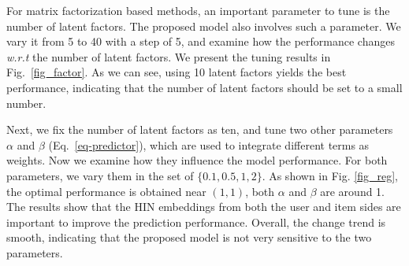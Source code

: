 For matrix factorization based methods, an important parameter to tune is the number of latent factors. The proposed model also involves such a parameter.
We vary it from 5 to 40 with a step of 5, and examine how the performance changes \emph{w.r.t} the number of latent factors.
We present the tuning results in Fig.~\ref{fig_factor}. As we can see, using 10 latent factors yields the best performance, indicating that
the number of latent factors should be set to a small number.

Next, we fix the number of latent factors as ten, and tune two other parameters $\alpha$ and $\beta$ (Eq.~\ref{eq-predictor}), which are used to integrate different terms as weights.
Now we examine how they influence the model performance. For both parameters, we vary them in the set of $\{0.1, 0.5, 1, 2\}$.
 As shown in Fig. \ref{fig_reg}, the optimal performance is obtained near $(1,1)$, \ie both $\alpha$ and $\beta$ are around 1. The results show that
 the HIN embeddings from both the user and item sides are important to improve the prediction performance.
 Overall, the change trend is smooth, indicating that the proposed model is not very sensitive to the two parameters.

%

